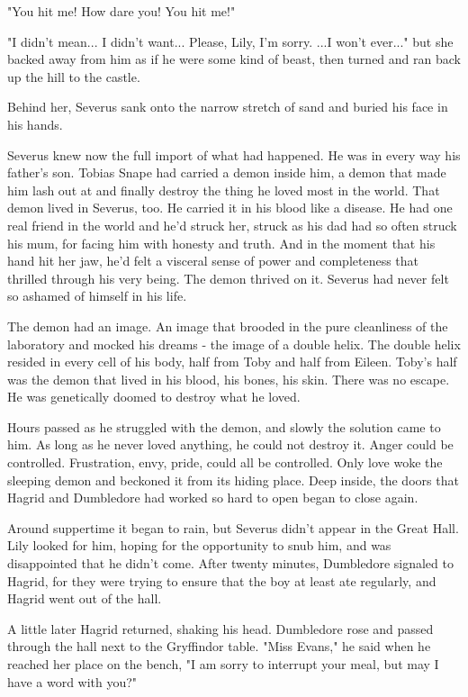 \documentclass[a4paper,11pt]{article}
\begin{document}
"You hit me! How dare you! You hit me!"

"I didn't mean... I didn't want... Please, Lily, I'm sorry. ...I won't ever..." but she backed away from him as if he were some kind of beast, then turned and ran back up the hill to the castle.

Behind her, Severus sank onto the narrow stretch of sand and buried his face in his hands.

Severus knew now the full import of what had happened. He was in every way his father's son. Tobias Snape had carried a demon inside him, a demon that made him lash out at and finally destroy the thing he loved most in the world. That demon lived in Severus, too. He carried it in his blood like a disease. He had one real friend in the world and he'd struck her, struck as his dad had so often struck his mum, for facing him with honesty and truth. And in the moment that his hand hit her jaw, he'd felt a visceral sense of power and completeness that thrilled through his very being. The demon thrived on it. Severus had never felt so ashamed of himself in his life.

The demon had an image. An image that brooded in the pure cleanliness of the laboratory and mocked his dreams - the image of a double helix. The double helix resided in every cell of his body, half from Toby and half from Eileen. Toby's half was the demon that lived in his blood, his bones, his skin. There was no escape. He was genetically doomed to destroy what he loved.

Hours passed as he struggled with the demon, and slowly the solution came to him. As long as he never loved anything, he could not destroy it. Anger could be controlled. Frustration, envy, pride, could all be controlled. Only love woke the sleeping demon and beckoned it from its hiding place. Deep inside, the doors that Hagrid and Dumbledore had worked so hard to open began to close again.

Around suppertime it began to rain, but Severus didn't appear in the Great Hall. Lily looked for him, hoping for the opportunity to snub him, and was disappointed that he didn't come. After twenty minutes, Dumbledore signaled to Hagrid, for they were trying to ensure that the boy at least ate regularly, and Hagrid went out of the hall.

A little later Hagrid returned, shaking his head. Dumbledore rose and passed through the hall next to the Gryffindor table. "Miss Evans," he said when he reached her place on the bench, "I am sorry to interrupt your meal, but may I have a word with you?"
\end{document}
